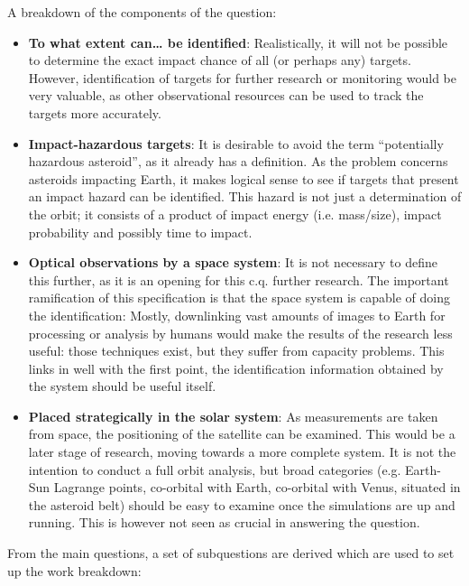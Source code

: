 A breakdown of the components of the question:
\begin{itemize}
\item \textbf{To what extent can… be identified}: Realistically, it will not be possible to determine the exact impact chance of all (or perhaps any) targets. However, identification of targets for further research or monitoring would be very valuable, as other observational resources can be used to track the targets more accurately.
\item \textbf{Impact-hazardous targets}: It is desirable to avoid the term “potentially hazardous asteroid”, as it already has a definition. As the problem concerns asteroids impacting Earth, it makes logical sense to see if targets that present an impact hazard can be identified. This hazard is not just a determination of the orbit; it consists of a product of impact energy (i.e. mass/size), impact probability and possibly time to impact.
\item \textbf{Optical observations by a space system}: It is not necessary to define this further, as it is an opening for this c.q. further research. The important ramification of this specification is that the space system is capable of doing the identification: Mostly, downlinking vast amounts of images to Earth for processing or analysis by humans would make the results of the research less useful: those techniques exist, but they suffer from capacity problems. This links in well with the first point, the identification information obtained by the system should be useful itself.
\item \textbf{Placed strategically in the solar system}: As measurements are taken from space, the positioning of the satellite can be examined. This would be a later stage of research, moving towards a more complete system. It is not the intention to conduct a full orbit analysis, but broad categories (e.g. Earth-Sun Lagrange points, co-orbital with Earth, co-orbital with Venus, situated in the asteroid belt) should be easy to examine once the simulations are up and running. This is however not seen as crucial in answering the question.
\end{itemize}

\renewcommand{\labelenumii}{\theenumii}
\renewcommand{\theenumii}{\theenumi.\arabic{enumii}.}
\vspace{0.3cm}
From the main questions, a set of subquestions are derived which are used to set up the work breakdown:

